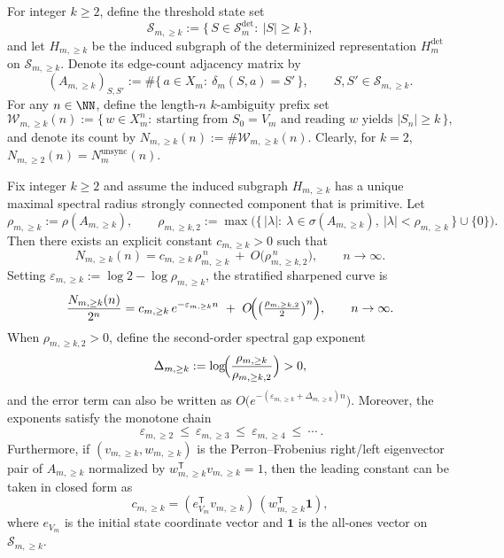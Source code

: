 \begin{definition}\label{def:Ym-ambiguity-level-k}
For integer \(k\ge 2\), define the threshold state set
\[
\mathcal{S}_{m,\ge k}:=\{\,S\in\mathcal{S}_m^{\mathrm{det}}:\ |S|\ge k\,\},
\]
and let \(H_{m,\ge k}\) be the induced subgraph of the determinized representation \(H_m^{\mathrm{det}}\) on \(\mathcal{S}_{m,\ge k}\).
Denote its edge-count adjacency matrix by
\[
(A_{m,\ge k})_{S,S'}:=\#\{\,a\in X_m:\ \delta_m(S,a)=S'\,\},\qquad S,S'\in\mathcal{S}_{m,\ge k}.
\]
For any \(n\in\NN\), define the length-\(n\) \(k\)-ambiguity prefix set
\[
\mathcal{W}_{m,\ge k}(n)
:=\{\,w\in X_m^n:\ \text{starting from }S_0=V_m\text{ and reading }w\text{ yields }|S_n|\ge k\,\},
\]
and denote its count by \(N_{m,\ge k}(n):=\#\mathcal{W}_{m,\ge k}(n)\).
Clearly, for \(k=2\), \(N_{m,\ge 2}(n)=N_m^{\mathrm{unsync}}(n)\).
\end{definition}

\begin{theorem}\label{thm:Ym-ambiguity-spectrum-law}
Fix integer \(k\ge 2\) and assume the induced subgraph \(H_{m,\ge k}\) has a unique maximal spectral radius strongly connected component that is primitive.
Let
\[
\rho_{m,\ge k}:=\rho(A_{m,\ge k}),\qquad
\rho_{m,\ge k,2}:=\max\bigl(\{\,|\lambda|:\ \lambda\in\sigma(A_{m,\ge k}),\ |\lambda|<\rho_{m,\ge k}\,\}\cup\{0\}\bigr).
\]
Then there exists an explicit constant \(c_{m,\ge k}>0\) such that
\[
N_{m,\ge k}(n)=c_{m,\ge k}\,\rho_{m,\ge k}^{\,n}\ +\ O\!\bigl(\rho_{m,\ge k,2}^{\,n}\bigr),
\qquad n\to\infty.
\]
Setting \(\varepsilon_{m,\ge k}:=\log 2-\log\rho_{m,\ge k}\), the stratified sharpened curve is
\[
\frac{N_{m,\ge k}(n)}{2^n}
=c_{m,\ge k}\,e^{-\varepsilon_{m,\ge k} n}\ +\ O\!\Bigl(\bigl(\tfrac{\rho_{m,\ge k,2}}{2}\bigr)^{n}\Bigr),
\qquad n\to\infty.
\]
When \(\rho_{m,\ge k,2}>0\), define the second-order spectral gap exponent
\[
\Delta_{m,\ge k}:=\log\!\Bigl(\frac{\rho_{m,\ge k}}{\rho_{m,\ge k,2}}\Bigr)>0,
\]
and the error term can also be written as \(O\!\bigl(e^{-(\varepsilon_{m,\ge k}+\Delta_{m,\ge k})n}\bigr)\).
Moreover, the exponents satisfy the monotone chain
\[
\boxed{\ \varepsilon_{m,\ge 2}\ \le\ \varepsilon_{m,\ge 3}\ \le\ \varepsilon_{m,\ge 4}\ \le\ \cdots\ }.
\]
Furthermore, if \((v_{m,\ge k},w_{m,\ge k})\) is the Perron--Frobenius right/left eigenvector pair of \(A_{m,\ge k}\) normalized by \(w_{m,\ge k}^{\mathsf T}v_{m,\ge k}=1\), then the leading constant can be taken in closed form as
\[
c_{m,\ge k}=(e_{V_m}^{\mathsf T}v_{m,\ge k})\,(w_{m,\ge k}^{\mathsf T}\mathbf 1),
\]
where \(e_{V_m}\) is the initial state coordinate vector and \(\mathbf 1\) is the all-ones vector on \(\mathcal{S}_{m,\ge k}\).
\end{theorem}

